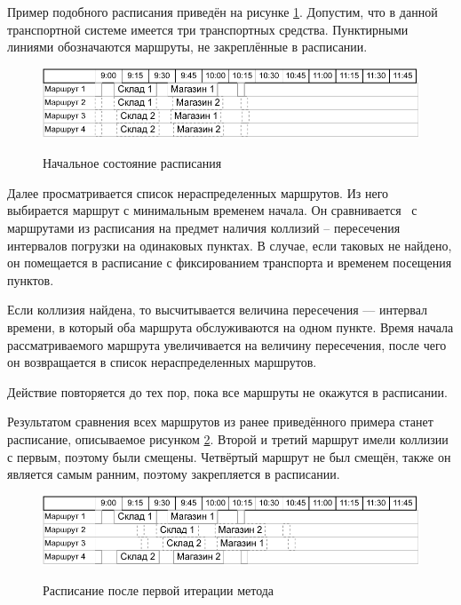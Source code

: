 	 Пример подобного расписания приведён на рисунке \ref{pic:sch_1}. Допустим, что в данной транспортной системе имеется три транспортных средства. Пунктирными линиями обозначаются маршруты, не закреплённые в расписании.
	
	\begin{figure}[h]
		\begin{center}
			{\includegraphics[scale=1.0, angle=0]{img/schedule/1.pdf}}
			\caption{Начальное состояние расписания}
			\label{pic:sch_1}
		\end{center}
	\end{figure}
	
	Далее просматривается список нераспределенных маршрутов. Из него \, выбирается маршрут с минимальным временем начала. Он сравнивается \, с \, маршрутами из расписания на предмет наличия коллизий -- пересечения интервалов погрузки на одинаковых пунктах. В случае, если таковых не найдено, он помещается в расписание с фиксированием транспорта и временем посещения пунктов. 
	
	Если коллизия найдена, то высчитывается величина пересечения --- интервал времени, в который оба маршрута обслуживаются на одном пункте. Время начала рассматриваемого маршрута увеличивается на величину пересечения, после чего он возвращается в список нераспределенных маршрутов. 
	
	Действие повторяется до тех пор, пока все маршруты не окажутся в расписании.
	
	Результатом сравнения всех маршрутов из ранее приведённого примера станет расписание, описываемое рисунком \ref{pic:sch_2}. Второй и третий маршрут имели коллизии с первым, поэтому были смещены. Четвёртый маршрут не был смещён, также он является самым ранним, поэтому закрепляется в расписании.
	
	\begin{figure}[h]
		\begin{center}
			{\includegraphics[scale=1.0, angle=0]{img/schedule/2.pdf}}
			\caption{Расписание после первой итерации метода}
			\label{pic:sch_2}
		\end{center}
	\end{figure}

